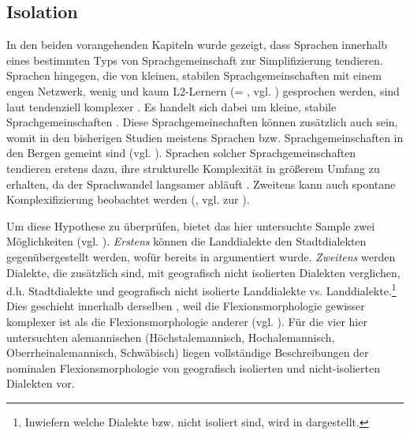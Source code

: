 \subsection{Isolation}\label{3.2.5}

In den beiden vorangehenden Kapiteln wurde gezeigt, dass Sprachen innerhalb eines bestimmten Typs von Sprachgemeinschaft zur Simplifizierung tendieren. Sprachen hingegen, die von kleinen, stabilen Sprachgemeinschaften mit einem engen Netzwerk, wenig  und kaum L2-Ler\-nern (= , vgl. ) gesprochen werden, sind laut \citet{Trudgill2011} tendenziell komplexer \citep[146–147]{Trudgill2011}. Es handelt sich dabei um kleine, stabile Sprachgemeinschaften . Diese Sprachgemeinschaften können zusätzlich auch  sein, womit in den bisherigen Studien meistens Sprachen bzw. Sprachgemeinschaften in den Bergen gemeint sind (vgl. ). Sprachen solcher Sprachgemeinschaften tendieren erstens dazu, ihre strukturelle Komplexität in größerem Umfang zu erhalten, da der Sprachwandel langsamer abläuft \citep[103]{Trudgill2011}. Zweitens kann auch spontane Komplexifizierung beobachtet werden (\citealt[71]{Trudgill2011}, vgl.  zur ).

Um diese Hypothese zu überprüfen, bietet das hier untersuchte Sample zwei Möglichkeiten (vgl. ). \textit{Erstens} können die Landdialekte den Stadtdialekten gegenübergestellt werden, wofür bereits in  argumentiert wurde. \textit{Zweitens} werden Dialekte, die zusätzlich  sind, mit geografisch nicht isolierten Dialekten verglichen, d.h. Stadtdialekte und geografisch nicht isolierte Landdialekte vs.  Landdialekte.\footnote{Inwiefern welche Dialekte  bzw. nicht isoliert sind, wird in  dargestellt.} Dies geschieht innerhalb derselben , weil die Flexionsmorphologie gewisser  komplexer ist als die Flexionsmorphologie anderer  (vgl. ). Für die vier hier untersuchten alemannischen  (Höchstalemannisch, Hochalemannisch, Oberrheinalemannisch, Schwäbisch) liegen vollständige Beschreibungen der nominalen Flexionsmorphologie von geografisch isolierten und nicht-isolierten Dialekten vor.\\



